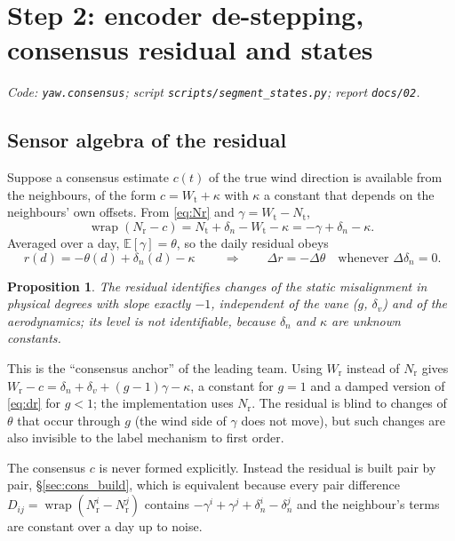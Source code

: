 \documentclass[11pt,a4paper]{article}
\newtheorem{proposition}{Proposition}
\theoremstyle{remark}
\newcommand{\wrap}{\operatorname{wrap}}
\newcommand{\E}{\mathbb{E}}
\newcommand{\code}[1]{\texttt{#1}}
\newcommand{\Wt}{W_{\mathrm{t}}}
\newcommand{\Nt}{N_{\mathrm{t}}}
\newcommand{\Wr}{W_{\mathrm{r}}}
\newcommand{\Nr}{N_{\mathrm{r}}}
\begin{document}
\section{Step 2: encoder de-stepping, consensus residual and states}\label{sec:step2}
\begin{sloppypar}
\emph{Code: \code{yaw.consensus}; script \code{scripts/segment\_states.py};
report \code{docs/02}.}
\end{sloppypar}

\subsection{Sensor algebra of the residual}\label{sec:algebra}
Suppose a consensus estimate $c(t)$ of the true wind direction is available from
the neighbours, of the form $c = \Wt + \kappa$ with $\kappa$ a constant that
depends on the neighbours' own offsets. From \eqref{eq:Nr} and
$\gamma=\Wt-\Nt$,
\begin{equation}
  \wrap(\Nr - c) = \Nt + \delta_n - \Wt - \kappa = -\gamma + \delta_n - \kappa .
  \label{eq:residual}
\end{equation}
Averaged over a day, $\E[\gamma]=\theta$, so the daily residual obeys
\begin{equation}
  \boxed{\ r(d) = -\theta(d) + \delta_n(d) - \kappa\ }
  \qquad\Longrightarrow\qquad
  \Delta r = -\Delta\theta \quad\text{whenever } \Delta\delta_n = 0 .
  \label{eq:dr}
\end{equation}
\begin{proposition}\label{prop:residual}
The residual identifies \emph{changes} of the static misalignment in physical
degrees with slope exactly $-1$, independent of the vane ($g$, $\delta_v$) and
of the aerodynamics; its \emph{level} is not identifiable, because $\delta_n$
and $\kappa$ are unknown constants.
\end{proposition}
\noindent This is the ``consensus anchor'' of the leading team. Using $\Wr$
instead of $\Nr$ gives $\Wr - c = \delta_n + \delta_v + (g-1)\gamma - \kappa$,
a constant for $g=1$ and a damped version of \eqref{eq:dr} for $g<1$; the
implementation uses $\Nr$. The residual is blind to changes of $\theta$ that
occur through $g$ (the wind side of $\gamma$ does not move), but such changes
are also invisible to the label mechanism to first order.

The consensus $c$ is never formed explicitly. Instead the residual is built pair
by pair, \S\ref{sec:cons_build}, which is equivalent because every pair
difference $D_{ij} = \wrap(\Nr^i-\Nr^j)$ contains $-\gamma^i+\gamma^j+\delta_n^i-\delta_n^j$
and the neighbour's terms are constant over a day up to noise.
\end{document}
